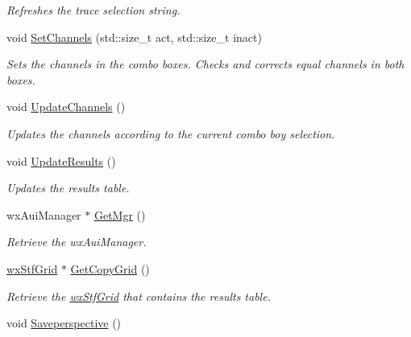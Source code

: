 \begin{DoxyCompactItemize}
\begin{DoxyCompactList}\small\item\em Refreshes the trace selection string. \item\end{DoxyCompactList}\item 
void \hyperlink{classwxStfChildFrame_a4dcae3a72bd8cbf4ec88fa8c175a5263}{SetChannels} (std::size\_\-t act, std::size\_\-t inact)
\begin{DoxyCompactList}\small\item\em Sets the channels in the combo boxes. Checks and corrects equal channels in both boxes. \item\end{DoxyCompactList}\item 
\hypertarget{classwxStfChildFrame_ad51c5aaa777d50ce3577bacc5c282ca4}{
void \hyperlink{classwxStfChildFrame_ad51c5aaa777d50ce3577bacc5c282ca4}{UpdateChannels} ()}
\label{classwxStfChildFrame_ad51c5aaa777d50ce3577bacc5c282ca4}

\begin{DoxyCompactList}\small\item\em Updates the channels according to the current combo boy selection. \item\end{DoxyCompactList}\item 
void \hyperlink{classwxStfChildFrame_aa74cf4d2706de49d7e62c6ce7bffa2e6}{UpdateResults} ()
\begin{DoxyCompactList}\small\item\em Updates the results table. \item\end{DoxyCompactList}\item 
wxAuiManager $\ast$ \hyperlink{classwxStfChildFrame_a68df0de27a7818fc273e23e3773fd0da}{GetMgr} ()
\begin{DoxyCompactList}\small\item\em Retrieve the wxAuiManager. \item\end{DoxyCompactList}\item 
\hyperlink{classwxStfGrid}{wxStfGrid} $\ast$ \hyperlink{classwxStfChildFrame_a4e2fab6fd5eea1a8da903bac45823fef}{GetCopyGrid} ()
\begin{DoxyCompactList}\small\item\em Retrieve the \hyperlink{classwxStfGrid}{wxStfGrid} that contains the results table. \item\end{DoxyCompactList}\item 
\hypertarget{classwxStfChildFrame_ab3d88fc327c7f4dcfde46f4764a02152}{
void \hyperlink{classwxStfChildFrame_ab3d88fc327c7f4dcfde46f4764a02152}{Saveperspective} ()}
\label{classwxStfChildFrame_ab3d88fc327c7f4dcfde46f4764a02152}


\end{DoxyCompactItemize}
